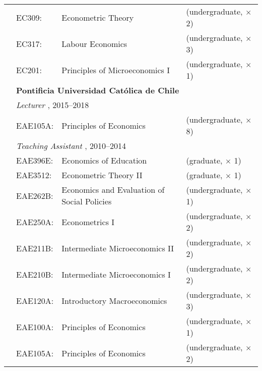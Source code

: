 \begin{tabular}{llll}
	  
	  \indent
	  
	& EC309:
	& Econometric Theory
	& (undergraduate, $\times$ 2)
	\\%
	
	& EC317:
	& Labour Economics
	& (undergraduate, $\times$ 3)
	\\%
	
	& EC201:
	& Principles of Microeconomics I
	& (undergraduate, $\times$ 1)
	\\[1em]
	
	
	&
	\multicolumn{3}{l}{
		\textbf{%
			Pontificia Universidad Cat\'olica de Chile
		}
	}
	\\[1ex]
	
	
	&
	\multicolumn{3}{l}{
		\textit{%
			Lecturer%
		}%
		,
		2015--2018
	}
	\\[.5ex]
	
	& EAE105A:
	& Principles of Economics
	& (undergraduate, $\times$ 8)
	\\[1em]
	
	
	&
	\multicolumn{3}{l}{
		\textit{%
			Teaching Assistant%
		}%
		,
		2010--2014
	}
	\\[.5ex]
	
	& EAE396E:
	& Economics of Education
	& (graduate, $\times$ 1)
	\\%
	
	& EAE3512:
	& Econometric Theory II
	& (graduate, $\times$ 1)
	\\%
	
	& EAE262B:
	& Economics and Evaluation of Social Policies\hphantom{ooo}
	& (undergraduate, $\times$ 1)
%	
	\\%
	
	& EAE250A:
	& Econometrics I
	& (undergraduate, $\times$ 2)
	\\%
	
	& EAE211B:
	& Intermediate Microeconomics II
	& (undergraduate, $\times$ 2)
	\\%
	
	& EAE210B:
	& Intermediate Microeconomics I
	& (undergraduate, $\times$ 2)
	\\%
	
	& EAE120A:
	& Introductory Macroeconomics
	& (undergraduate, $\times$ 3)
	\\%
	
	& EAE100A:
	& Principles of Economics
	& (undergraduate, $\times$ 1)
	\\%
	
	& EAE105A:
	& Principles of Economics
	& (undergraduate, $\times$ 2)
	\\%
	
\end{tabular}